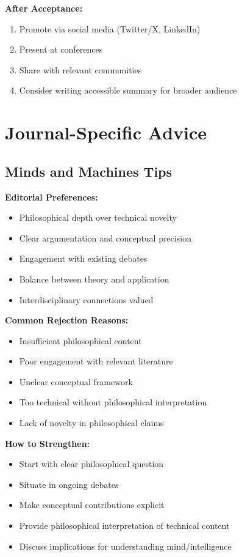 \documentclass[12pt]{article}
\begin{document}
\textbf{After Acceptance:}
\begin{enumerate}[leftmargin=*]
\item Promote via social media (Twitter/X, LinkedIn)
\item Present at conferences
\item Share with relevant communities
\item Consider writing accessible summary for broader audience
\end{enumerate}

\section{Journal-Specific Advice}

\subsection{Minds and Machines Tips}

\textbf{Editorial Preferences:}
\begin{itemize}[leftmargin=*]
\item Philosophical depth over technical novelty
\item Clear argumentation and conceptual precision
\item Engagement with existing debates
\item Balance between theory and application
\item Interdisciplinary connections valued
\end{itemize}

\textbf{Common Rejection Reasons:}
\begin{itemize}[leftmargin=*]
\item Insufficient philosophical content
\item Poor engagement with relevant literature
\item Unclear conceptual framework
\item Too technical without philosophical interpretation
\item Lack of novelty in philosophical claims
\end{itemize}

\textbf{How to Strengthen:}
\begin{itemize}[leftmargin=*]
\item Start with clear philosophical question
\item Situate in ongoing debates
\item Make conceptual contributions explicit
\item Provide philosophical interpretation of technical content
\item Discuss implications for understanding mind/intelligence
\end{itemize}
\end{document}
